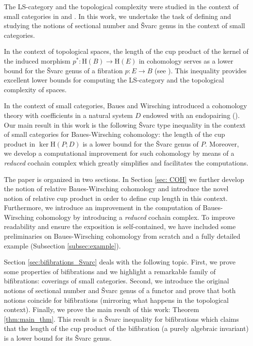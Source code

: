 \documentclass[12pt,reqno]{amsart}
\theoremstyle{definition}
\theoremstyle{remark}
\numberwithin{figure}{section}%
\newcommand{\Ho}{\mathrm{H}}
\begin{document}
The LS-category and the topological
complexity were studied in the context of small categories in \cite{TANAKA} and \cite{MAC-MOSQ-FUNCT}. In this work, we undertake the task of defining and studying the notions of sectional number and \v{S}varc genus in the context of small categories. 

In the context of topological spaces, the length of the cup product of the kernel of the induced morphism $p^*\colon \Ho(B)\to \Ho(E)$ in cohomology serves as a lower bound for the Švarc genus of a fibration $p\colon E\to B$ (see \cite{Svarc}). This inequality provides excellent lower bounds for computing the LS-category and the topological complexity of spaces. 

In the context of small categories, Baues and Wirsching introduced a cohomology theory with coefficients in a natural system $D$ endowed with an endopairing (\cite{BAUES0, BAUES1}). Our main result in this work is the following Švarc type inequality in the context of small categories for Baues-Wirsching cohomology: the length of the cup product in $\ker\Ho(P;D)$ is a lower bound for the \v{S}varc genus of $P$. Moreover, we develop a computational improvement for such cohomology by means of a \emph{reduced} cochain complex which greatly simplifies and facilitates the computations.

The paper is organized in two sections. In Section \ref{sec: COH} we further develop the notion of relative Baues-Wirsching cohomology \cite{Baues1989TheCO} and introduce the novel notion of relative cup product in order to define cup length in this context. Furthermore, we introduce an improvement in the computation of Baues-Wirsching cohomology by introducing a \emph{reduced} cochain complex. To improve readability and ensure the exposition is self-contained, we have included 
some preliminaries on Baues-Wirsching cohomology from scratch and a fully detailed example (Subsection \ref{subsec:example}).

Section \ref{sec:bifibrations_Svarc} deals with the following topic.  First, we prove some properties of bifibrations and we highlight a remarkable family of bifibrations: coverings of small categories. Second, we introduce the original notions of sectional number and  \v{S}varc genus of a functor and prove that both notions coincide for bifibrations (mirroring what happens in the topological context). Finally, we prove the main result of this work: Theorem \ref{thm:main_thm}. This result is a \v{S}varc inequality for bifibrations which claims that the length of the cup product of the bifibration (a purely algebraic invariant) is a lower bound for its \v{S}varc genus.
\end{document}
